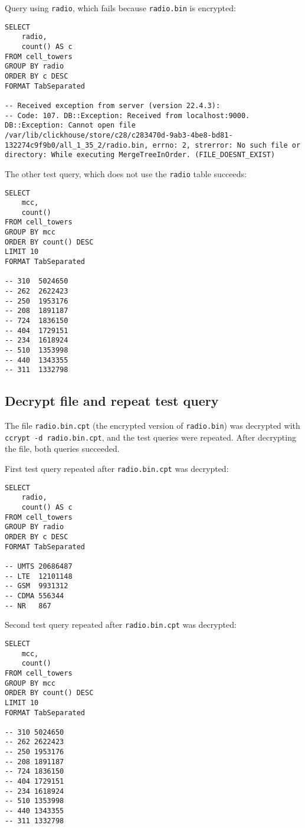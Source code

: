 Query using \texttt{radio}, which fails because \texttt{radio.bin} is encrypted:
\begin{verbatim}
SELECT
    radio,
    count() AS c
FROM cell_towers
GROUP BY radio
ORDER BY c DESC
FORMAT TabSeparated

-- Received exception from server (version 22.4.3):
-- Code: 107. DB::Exception: Received from localhost:9000. DB::Exception: Cannot open file /var/lib/clickhouse/store/c28/c283470d-9ab3-4be8-bd81-132274c9f9b0/all_1_35_2/radio.bin, errno: 2, strerror: No such file or directory: While executing MergeTreeInOrder. (FILE_DOESNT_EXIST)
\end{verbatim}

The other test query, which does not use the \texttt{radio} table succeeds:
\begin{verbatim}
SELECT
    mcc,
    count()
FROM cell_towers
GROUP BY mcc
ORDER BY count() DESC
LIMIT 10
FORMAT TabSeparated

-- 310  5024650
-- 262  2622423
-- 250  1953176
-- 208  1891187
-- 724  1836150
-- 404  1729151
-- 234  1618924
-- 510  1353998
-- 440  1343355
-- 311  1332798
\end{verbatim}
\subsection{Decrypt file and repeat test query}
\label{sec:org164be71}
The file \texttt{radio.bin.cpt} (the encrypted version of \texttt{radio.bin}) was decrypted
with \texttt{ccrypt -d radio.bin.cpt},
and the test queries were repeated.
After decrypting the file, both queries succeeded.

First test query repeated after \texttt{radio.bin.cpt} was decrypted:
\begin{verbatim}
SELECT
    radio,
    count() AS c
FROM cell_towers
GROUP BY radio
ORDER BY c DESC
FORMAT TabSeparated

-- UMTS 20686487
-- LTE  12101148
-- GSM  9931312
-- CDMA 556344
-- NR   867
\end{verbatim}

Second test query repeated after \texttt{radio.bin.cpt} was decrypted:
\begin{verbatim}
SELECT
    mcc,
    count()
FROM cell_towers
GROUP BY mcc
ORDER BY count() DESC
LIMIT 10
FORMAT TabSeparated

-- 310 5024650
-- 262 2622423
-- 250 1953176
-- 208 1891187
-- 724 1836150
-- 404 1729151
-- 234 1618924
-- 510 1353998
-- 440 1343355
-- 311 1332798
\end{verbatim}

